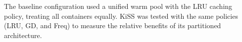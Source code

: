 The baseline configuration used a unified warm pool with the LRU caching policy, treating all containers equally. KiSS was tested with the same policies (LRU, GD, and Freq) to measure the relative benefits of its partitioned architecture.




